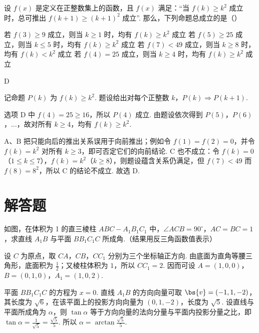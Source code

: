 \begin{problem}
设 \(f(x)\) 是定义在正整数集上的函数，且 \(f(x)\) 满足：“当 \(f(k) \geqslant k^2\) 成立时，总可推出 \(f(k + 1) \geqslant (k + 1)^2\) 成立”. 那么，下列命题总成立的是（\quad）

\choices
    {若 \(f(3) \geqslant 9\) 成立，则当 \(k \geqslant 1\) 时，均有 \(f(k) \geqslant k^2\) 成立}
    {若 \(f(5) \geqslant 25\) 成立，则当 \(k \leqslant 5\) 时，均有 \(f(k) \geqslant k^2\) 成立}
    {若 \(f(7) < 49\) 成立，则当 \(k \geqslant 8\) 时，均有 \(f(k) < k^2\) 成立}
    {若 \(f(4) = 25\) 成立，则当 \(k \geqslant 4\) 时，均有 \(f(k) \geqslant k^2\) 成立}
\end{problem}

\begin{answer}
D
\end{answer}

\begin{solution}
记命题 \(P(k)\) 为 \(f(k)\geqslant k^2\). 题设给出对每个正整数 \(k\)，\(P(k)\Rightarrow P(k+1)\).

选项 D 中 \(f(4)=25\geqslant16\)，所以 \(P(4)\) 成立. 由题设依次得到 \(P(5)\)，\(P(6)\)，\(\ldots\)，故对所有 \(k\geqslant4\)，均有 \(f(k)\geqslant k^2\).

A、B 把只能向后的推出关系误用于向前推出；例如令 \(f(1)=f(2)=0\)，并令 \(f(k)=k^2\) 对所有 \(k\geqslant3\)，即可否定它们的向前结论. C 也不成立：令 \(f(k)=0\)（\(1\leqslant k\leqslant7\)），\(f(k)=k^2\)（\(k\geqslant8\)），则题设蕴含关系仍满足，但 \(f(7)<49\) 而 \(f(8)=8^2\)，所以 C 的结论不成立. 故选 D.
\end{solution}

\section{解答题}
\begin{problem}
如图，在体积为 1 的直三棱柱 \(ABC - A_{1}B_{1}C_{1}\) 中，\(\angle ACB = 90^{\circ}\)，\(AC = BC = 1\)，求直线 \(A_{1}B\) 与平面 \(BB_{1}C_{1}C\) 所成角.（结果用反三角函数值表示）

\end{problem}

\begin{solution}
设 \(C\) 为原点，取 \(CA\)，\(CB\)，\(CC_1\) 分别为三个坐标轴正方向. 由底面为直角等腰三角形，底面积为 \(\frac12\)；又棱柱体积为 \(1\)，所以 \(CC_1=2\). 因而可设 \(A=(1,0,0)\)，\(B=(0,1,0)\)，\(A_1=(1,0,2)\).

平面 \(BB_1C_1C\) 的方程为 \(x=0\). 直线 \(A_1B\) 的方向向量可取 \(\bs{v}=(-1,1,-2)\)，其长度为 \(\sqrt6\)，在该平面上的投影方向向量为 \((0,1,-2)\)，长度为 \(\sqrt5\). 设直线与平面所成角为 \(\alpha\)，则 \(\tan\alpha\) 等于方向向量的法向分量与平面内投影分量之比，即 \(\tan\alpha=\frac{1}{\sqrt5}=\frac{\sqrt5}{5}\). 所以 \(\alpha=\arctan\frac{\sqrt5}{5}\).
\end{solution}

